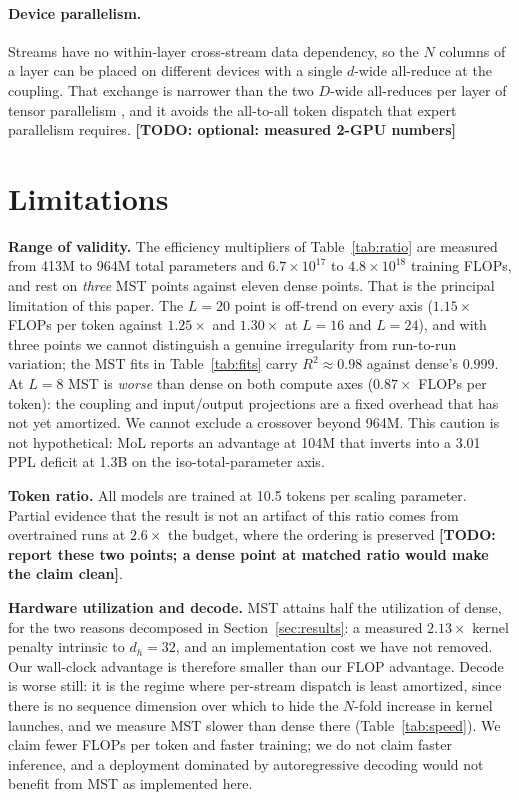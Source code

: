 \documentclass{article}
\newcommand{\TODO}[1]{{\color{red}\textbf{[TODO: #1]}}}
\newcommand{\dmodel}{D}
\newcommand{\dsub}{d}
\newcommand{\nsub}{N}
\begin{document}
\paragraph{Device parallelism.} Streams have no within-layer cross-stream data
dependency, so the $\nsub$ columns of a layer can be placed on different devices
with a single $\dsub$-wide all-reduce at the coupling. That exchange is narrower
than the two $\dmodel$-wide all-reduces per layer of tensor parallelism
\citep{shoeybi2021megatron}, and it avoids the all-to-all token dispatch that
expert parallelism requires. \TODO{optional: measured 2-GPU numbers}

\section{Limitations}
\label{sec:limitations}

\textbf{Range of validity.} The efficiency multipliers of Table~\ref{tab:ratio}
are measured from 413M to 964M total parameters and $6.7\times10^{17}$ to
$4.8\times10^{18}$ training FLOPs, and rest on \emph{three} MST points against
eleven dense points. That is the principal limitation of this paper. The $L{=}20$
point is off-trend on every axis ($1.15\times$ FLOPs per token against
$1.25\times$ and $1.30\times$ at $L{=}16$ and $L{=}24$), and with three points we
cannot distinguish a genuine irregularity from run-to-run variation; the MST fits
in Table~\ref{tab:fits} carry $R^2 \approx 0.98$ against dense's $0.999$. At
$L{=}8$ MST is \emph{worse} than dense on both compute axes ($0.87\times$ FLOPs
per token): the coupling and input/output projections are a fixed overhead that
has not yet amortized. We cannot exclude a crossover beyond 964M. This caution is not hypothetical: MoL
reports an advantage at 104M that inverts into a 3.01 PPL deficit at 1.3B on the
iso-total-parameter axis.

\textbf{Token ratio.} All models are trained at 10.5 tokens per scaling parameter.
Partial evidence that the result is not an artifact of this ratio comes from
overtrained runs at $2.6\times$ the budget, where the ordering is preserved
\TODO{report these two points; a dense point at matched ratio would make the
claim clean}.

\textbf{Hardware utilization and decode.} MST attains half the utilization of
dense, for the two reasons decomposed in Section~\ref{sec:results}: a measured
$2.13\times$ kernel penalty intrinsic to $d_h{=}32$, and an implementation cost
we have not removed. Our wall-clock advantage is therefore smaller than our FLOP
advantage. Decode is worse still: it is the regime where per-stream dispatch is
least amortized, since there is no sequence dimension over which to hide the
$\nsub$-fold increase in kernel launches, and we measure MST slower than dense
there (Table~\ref{tab:speed}). We claim fewer FLOPs per token and faster
training; we do not claim faster inference, and a deployment dominated by
autoregressive decoding would not benefit from MST as implemented here.
\end{document}
